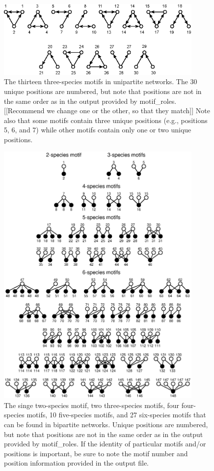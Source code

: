\documentclass[12pt]{article}
\begin{document}
	\begin{figure}[ht]
	  \centering
		\includegraphics*[width=0.9\textwidth]{unipartite_motifs.eps}
		\caption{The thirteen three-species motifs in unipartite networks. The 30 unique positions are numbered, but note that positions are not in the same order as in the output provided by motif\_roles. [[Recommend we change one or the other, so that they match]] Note also that some motifs contain three unique positions (e.g., positions 5, 6, and 7) while other motifs contain only one or two unique positions.}
		\label{fig:3sp_unipartite}
	\end{figure}


	\begin{figure}[ht]
	  \centering
		\includegraphics*[width=0.9\textwidth]{bipartite_motifs.eps}
			  \vspace{0.5cm}
		\caption{The singe two-species motif, two three-species motifs, four four-species motifs, 10 five-species motifs, and 27 six-species motifs that can be found in bipartite networks. Unique positions are numbered, but note that positions are not in the same order as in the output provided by motif\_roles. If the identity of particular motifs and/or positions is important, be sure to note the motif number and position information provided in the output file.}
		\label{bipartite_motifs}
	\end{figure}

\clearpage




\clearpage
\end{document}
